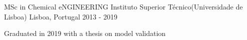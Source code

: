 

\begin{cventries}

  \cventry
    {MSc in Chemical eNGINEERING} %
    {Instituto Superior Técnico(Universidade de Lisboa)} %
    {Lisboa, Portugal} %
    {2013 - 2019} %
    {
      \begin{cvitems} %
        \item {Graduated in 2019 with a thesis on model validation}
      \end{cvitems}
    }

\end{cventries}